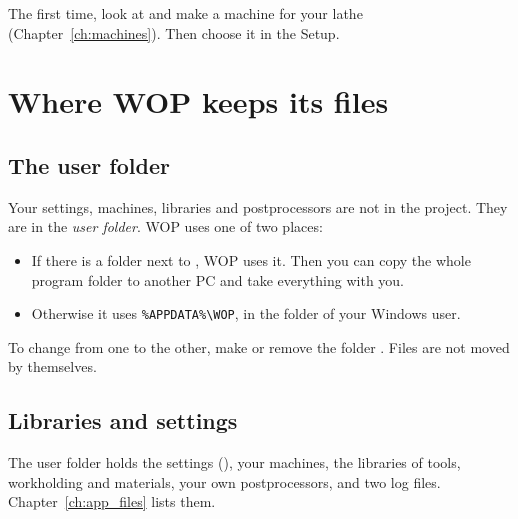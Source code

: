 The first time, look at  and make a machine for your lathe (Chapter~\ref{ch:machines}). Then choose it in the Setup.

\section{Where WOP keeps its files}
\subsection{The user folder}
Your settings, machines, libraries and postprocessors are not in the project. They are in the \emph{user folder}. WOP uses one of two places:
\begin{itemize}
  \item If there is a folder  next to , WOP uses it. Then you can copy the whole program folder to another PC and take everything with you.
  \item Otherwise it uses \texttt{\%APPDATA\%\textbackslash WOP}, in the folder of your Windows user.
\end{itemize}
To change from one to the other, make or remove the folder . Files are not moved by themselves.

\subsection{Libraries and settings}
The user folder holds the settings (), your machines, the libraries of tools, workholding and materials, your own postprocessors, and two log files. Chapter~\ref{ch:app_files} lists them.

